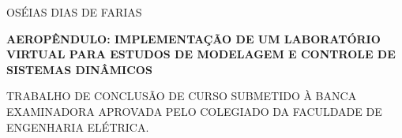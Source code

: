 
	\thispagestyle{empty}
	
	\begin{center}
			OSÉIAS DIAS DE FARIAS
			\vspace{2cm}


			\textbf{AEROPÊNDULO: IMPLEMENTAÇÃO DE UM LABORATÓRIO VIRTUAL PARA ESTUDOS DE MODELAGEM E CONTROLE DE SISTEMAS DINÂMICOS}
			

	\end{center}
        \vspace{1cm}


			\par\noindent \small{TRABALHO DE CONCLUSÃO DE CURSO SUBMETIDO  À BANCA EXAMINADORA APROVADA PELO COLEGIADO DA FACULDADE DE ENGENHARIA ELÉTRICA.}

            \vspace{1cm}


